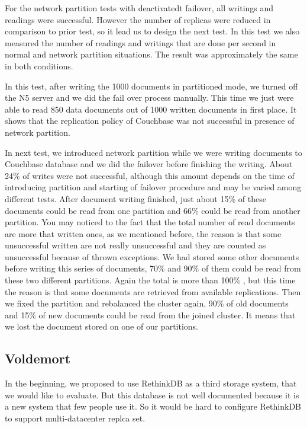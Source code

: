 \documentclass[a4paper]{article}
\begin{document}
For the network partition tests with deactivatedt failover, all writings and readings were successful.  
However the number of replicas were reduced in comparison to prior test, so it lead us to design the next test. 
In this test we also measured the number of readings and writings that are done per second in normal and network partition situations.
The result was approximately the same in both conditions.

In this test, after writing the 1000 documents in partitioned mode, we turned off the N5 server and we did the fail over process manually.
This time we just were able to read 850 data documents out of 1000 written documents in first place. 
It shows that the replication policy of Couchbase was not successful in presence of network partition.

In next test, we introduced network partition while we were writing documents to Couchbase database and we did the failover before finishing the writing. 
About 24\% of writes were not successful, although this amount depends on the time of introducing partition and starting of failover procedure and may be varied among different tests.
After document writing finished, just about 15\% of these documents could be read from one partition and 66\% could be read from another partition.
You may noticed to the fact that the total number of read documents are more that written ones, as we mentioned before, the reason is that some unsuccessful written are not really unsuccessful and they are counted as unsuccessful because of thrown exceptions. 
We had stored some other documents before writing this series of documents, 70\% and 90\% of them could be read from these two different partitions.
Again the total is more than 100\% , but this time the reason is that some documents are retrieved from available replications. 
Then we fixed the partition and rebalanced the cluster again, 90\% of old documents and 15\% of new documents could be read from the joined cluster.
It means that we lost the document stored on one of our partitions.

\subsection{Voldemort}

In the beginning, we proposed to use RethinkDB as a third storage system, that we would like to evaluate. But this database is not well documented because it is a new system that few people use it. So it would be hard to configure RethinkDB to support multi-datacenter replca set.
\end{document}
